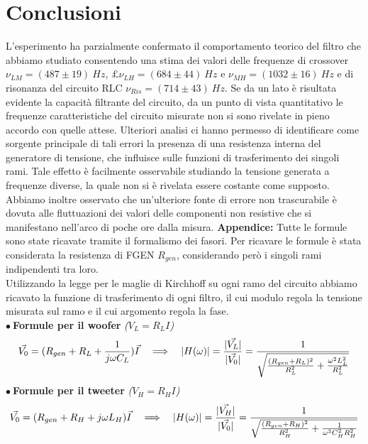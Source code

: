 \documentclass[]{article}
\begin{document}
\section{Conclusioni} 
L'esperimento ha parzialmente confermato il comportamento teorico del filtro che abbiamo studiato consentendo una stima dei valori delle frequenze di crossover $ \nu_{LM}=(487\pm19)\:Hz$,  $£ \nu_{LH}=(684\pm44)\:Hz $ e $ \nu_{MH}=(1032\pm16)\:Hz $ e di risonanza del circuito RLC  $ \nu_{Ris}=(714\pm43)\: Hz$. Se da un lato è risultata evidente la capacità filtrante del circuito, da un punto di vista quantitativo le frequenze caratteristiche del circuito misurate non si sono rivelate in pieno accordo con quelle attese. Ulteriori analisi ci hanno permesso di identificare come sorgente principale di tali errori la presenza di una resistenza interna del generatore di tensione, che influisce sulle funzioni di trasferimento dei singoli rami. Tale effetto è facilmente osservabile studiando la tensione generata a frequenze diverse, la quale non si è rivelata essere costante come supposto. Abbiamo inoltre osservato che un'ulteriore fonte di errore non trascurabile è dovuta alle fluttuazioni dei valori delle componenti non resistive che si manifestano nell'arco di poche ore dalla misura.
\newpage
{\large \textbf{Appendice: }}
Tutte le formule sono state ricavate tramite il formalismo dei fasori. Per ricavare le formule è stata considerata la resistenza di FGEN $ R_{gen} $, considerando però i singoli rami indipendenti tra loro.\\
Utilizzando la legge per le maglie di Kirchhoff su ogni ramo del circuito abbiamo ricavato la funzione di trasferimento di ogni filtro, il cui modulo regola la tensione misurata sul ramo e il cui argomento regola la fase.\\
$ \bullet \: $\textbf{Formule per il woofer} {\small\emph{($V_L=R_L I$)}}
\begin{equation}\label{V_{L}}
	\vec{V_0}=(R_{gen}+R_L+ \frac{1}{j\omega C_L})\vec{I}\quad  \Longrightarrow \quad \lvert H(\omega)\rvert=\frac{	\lvert \vec{ V_{L}} \rvert}{\lvert \vec{ V_{0}} \rvert}=\frac{1}{\sqrt{\frac{(R_{gen}+R_{L})^2}{R_{L}^{2}}+\frac{\omega^{2}L_{L}^{2}}{R_{L}^{2}}}}
\end{equation}
$ \bullet \: $\textbf{Formule per il tweeter} {\small\emph{($V_H=R_H I$)}}
\begin{equation}\label{V_{H}}
\vec{V_0}=(R_{gen}+R_H+j\omega L_H)\vec{I} \quad \Longrightarrow \quad \lvert H(\omega)\rvert=\frac{	\lvert \vec{V_H} \rvert}{\lvert \vec{V_0}\rvert} =\frac{1}{\sqrt{\frac{(R_{gen}+R_{H})^{2}}{R_{H}^{2}}+\frac{1}{\omega^{2}C_{H}^{2}R_{H}^{2}}}}
\end{equation}
\end{document}

